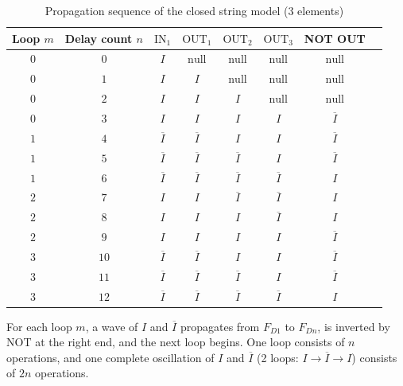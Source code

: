 \documentclass[12pt,a4paper]{article}
\begin{document}
\begin{table}[htbp]
  \centering
  \caption{Propagation sequence of the closed string model (3 elements)}
  \begin{tabular}{cccccccc}
    \toprule
    Loop $m$ & Delay count $n$ & $\mathrm{IN}_1$ & $\mathrm{OUT}_1$ & $\mathrm{OUT}_2$ & $\mathrm{OUT}_3$ & NOT OUT \\
    \midrule
    $0$ & $0$  & $I$            & $\mathrm{null}$  & $\mathrm{null}$  & $\mathrm{null}$  & $\mathrm{null}$ \\
    $0$ & $1$  & $I$            & $I$              & $\mathrm{null}$  & $\mathrm{null}$  & $\mathrm{null}$ \\
    $0$ & $2$  & $I$            & $I$              & $I$              & $\mathrm{null}$  & $\mathrm{null}$ \\
    $0$ & $3$  & $I$            & $I$              & $I$              & $I$              & $\overline{I}$  \\
    $1$ & $4$  & $\overline{I}$ & $\overline{I}$   & $I$              & $I$              & $\overline{I}$  \\
    $1$ & $5$  & $\overline{I}$ & $\overline{I}$   & $\overline{I}$   & $I$              & $\overline{I}$  \\
    $1$ & $6$  & $\overline{I}$ & $\overline{I}$   & $\overline{I}$   & $\overline{I}$   & $I$             \\
    $2$ & $7$  & $I$            & $I$              & $\overline{I}$   & $\overline{I}$   & $I$             \\
    $2$ & $8$  & $I$            & $I$              & $I$              & $\overline{I}$   & $I$             \\
    $2$ & $9$  & $I$            & $I$              & $I$              & $I$              & $\overline{I}$  \\
    $3$ & $10$ & $\overline{I}$ & $\overline{I}$   & $I$              & $I$              & $\overline{I}$  \\
    $3$ & $11$ & $\overline{I}$ & $\overline{I}$   & $\overline{I}$   & $I$              & $\overline{I}$  \\
    $3$ & $12$ & $\overline{I}$ & $\overline{I}$   & $\overline{I}$   & $\overline{I}$   & $I$             \\
    \bottomrule
  \end{tabular}
\end{table}

For each loop $m$, a wave of $I$ and $\overline{I}$ propagates from $F_{D1}$ to $F_{Dn}$, is inverted by NOT at the right end, and the next loop begins. One loop consists of $n$ operations, and one complete oscillation of $I$ and $\overline{I}$ (2 loops: $I \to \overline{I} \to I$) consists of $2n$ operations.
\end{document}
